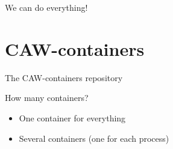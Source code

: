 \documentclass{beamer}
\begin{document}
\begin{frame}{We can do everything!}
\end{frame}

\section{CAW-containers}

\begin{frame}{The CAW-containers repository}
\end{frame}

\begin{frame}{How many containers?}
	\begin{itemize}
		\pause
		\item One container for everything
		\pause
		\item Several containers (one for each process)
	\end{itemize}
\end{frame}
\end{document}
